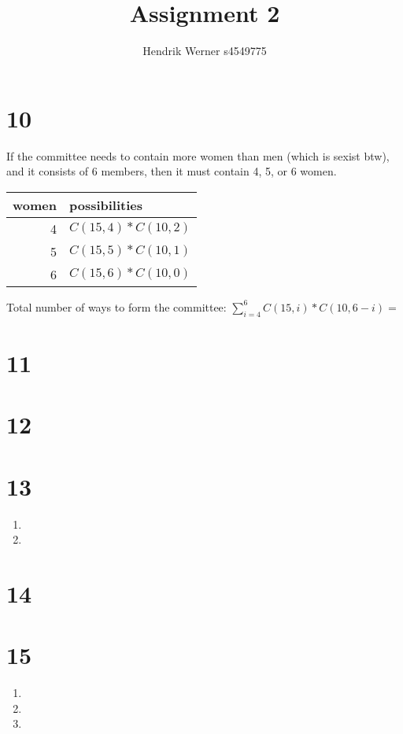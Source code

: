 \documentclass[12pt]{article}
\title{Assignment 2}
\author{
	Hendrik Werner s4549775
}
\begin{document}
\maketitle

\section{10}
If the committee needs to contain more women than men (which is sexist btw), and it consists of 6 members, then it must contain 4, 5, or 6 women.

\begin{tabular}{r|l}
	women & possibilities\\\hline
	4 & $C(15, 4) * C(10, 2)$\\
	5 & $C(15, 5) * C(10, 1)$\\
	6 & $C(15, 6) * C(10, 0)$
\end{tabular}

Total number of ways to form the committee: $\sum_{i=4}^{6} C(15, i) * C(10, 6 - i) = $

\section{11}

\section{12}

\section{13}
\begin{enumerate}[a]
	\item %
	\item %
\end{enumerate}

\section{14}

\section{15}
\begin{enumerate}[a]
	\item %
	\item %
	\item %
\end{enumerate}
\end{document}
